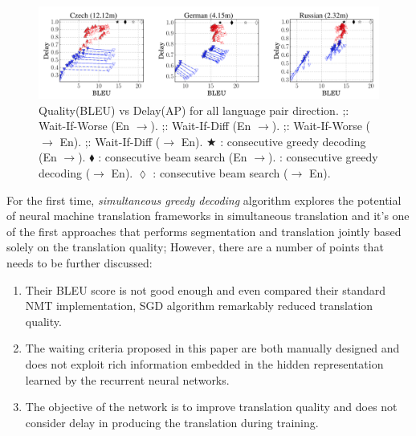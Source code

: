 \documentclass{sfuthesis}
\DeclareRobustCommand\marksymbol[2]{\tikz[#2,scale=1.2]\pgfuseplotmark{#1};}
\begin{document}
\begin{figure}[h]
\centering
\includegraphics[scale=0.35]{./images/SGDres0}
\vspace{0.7cm}
\caption[Quality vs Delay for SGD in all language-pair direction]
{Quality(BLEU) vs Delay(AP) for all language pair direction.
\protect\marksymbol{$\blacktriangle$}{red}\quad : Wait-If-Worse (En $\rightarrow$).
\marksymbol{$\blacktriangledown$}{blue}\quad : Wait-If-Diff (En $\rightarrow$).
\marksymbol{$\triangle$}{red}\quad : Wait-If-Worse ($\rightarrow$ En).
\marksymbol{$\triangledown$}{blue}\quad : Wait-If-Diff ($\rightarrow$ En).
$\bigstar$ : consecutive greedy decoding (En $\rightarrow$).
$\blacklozenge$ : consecutive beam search (En $\rightarrow$).
 : consecutive greedy decoding ($\rightarrow$ En).
$\lozenge$ : consecutive beam search ($\rightarrow$ En).
}
\label{fig:SGDres0}
\end{figure}
For the first time, \emph{simultaneous greedy decoding} algorithm explores the potential of neural machine translation frameworks in simultaneous translation and it's one of the first approaches that performs segmentation and translation jointly based solely on the translation quality; However, there are a number of points that needs to be further discussed:

\begin{enumerate}
    \item Their BLEU score is not good enough and even compared their standard NMT implementation, SGD algorithm remarkably reduced translation quality.
    \item The waiting criteria proposed in this paper are both manually designed and does not exploit rich information embedded in the hidden representation learned by the recurrent neural networks.
    \item The objective of the network is to improve translation quality and does not consider delay in producing the translation during training.
\end{enumerate}
\end{document}
